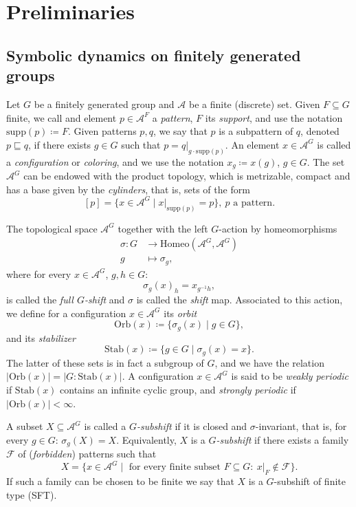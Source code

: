 \documentclass[letterpaper,11pt,reqno]{amsart}
\theoremstyle{plain}
\theoremstyle{definition}
\theoremstyle{cupremark}
\begin{document}
\section{Preliminaries}\label{section:preliminaries}

\subsection{Symbolic dynamics on finitely generated groups}
Let $G$ be a finitely generated group and $\mathcal{A}$ be a finite (discrete) set. Given $F\subseteq G$ finite, we call and element $p\in \mathcal{A}^{F}$ a \textit{pattern}, $F$ its \textit{support}, and use the notation $\mathrm{supp}(p)\coloneqq F$. Given patterns $p,q$, we say that $p$ is a subpattern of $q$, denoted $p\sqsubseteq q$, if there exists $g\in G$ such that $p=q|_{g\cdot \mathrm{supp}(p)}$. An element $x\in \mathcal{A}^G$ is called a \textit{configuration} or \textit{coloring}, and we use the notation $x_g\coloneqq x(g)$, $g\in G$. The set $\mathcal{A}^G$ can be endowed with the product topology, which is metrizable, compact and has a base given by the \textit{cylinders}, that is, sets of the form
$$
[p]=\{x\in \mathcal{A}^G\mid x|_{\mathrm{supp}(p)}=p \}, \ p\text{ a pattern}.
$$ 


The topological space $\mathcal{A}^G$ together with the left $G$-action by homeomorphisms
\begin{align*}
\sigma:G&\to \mathrm{Homeo}(\mathcal{A}^G,\mathcal{A}^G)\\
g&\mapsto \sigma_g,
\end{align*}
where for every $x\in \mathcal{A}^G$, $g,h\in G$:
$$
\sigma_g(x)_h=x_{g^{-1}h},
$$
is called the \textit{full $G$-shift} and $\sigma$ is called the \textit{shift} map. Associated to this action, we define for a configuration $x\in \mathcal{A}^G$ its \textit{orbit} $$\mathrm{Orb}(x)\coloneqq\{\sigma_g(x)\mid g\in G \},$$ and its \textit{stabilizer} $$\mathrm{Stab}(x)\coloneqq \{g\in G\mid \sigma_g(x)=x \}.$$ The latter of these sets is in fact a subgroup of $G$, and we have the relation $|\mathrm{Orb}(x)|=|G:\mathrm{Stab}(x)|$. A configuration $x\in \mathcal{A}^G$ is said to be \textit{weakly periodic} if $\mathrm{Stab}(x)$ contains an infinite cyclic group, and \textit{strongly periodic} if $|\mathrm{Orb}(x)|<\infty$.


A subset $X\subseteq \mathcal{A}^G$ is called a \textit{$G$-subshift} if it is closed and $\sigma$-invariant, that is, for every $g\in G$: $\sigma_g(X)=X$. Equivalently, $X$ is a \textit{$G$-subshift} if there exists a family $\mathcal{F}$ of (\textit{forbidden}) patterns such that
$$
X=\{x\in \mathcal{A}^G\mid \text{ for every finite subset }F\subseteq G:\ x|_{F}\notin \mathcal{F}  \}.
$$ 
If such a family can be chosen to be finite we say that $X$ is a $G$-subshift of finite type (SFT).
\end{document}
